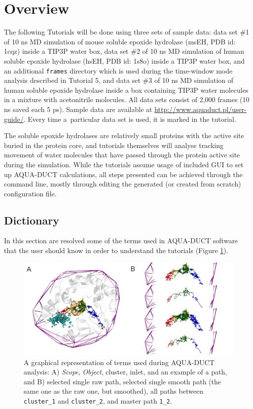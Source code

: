 \documentclass[9pt,tutorial]{livecoms}
\begin{document}
\section{Overview}
The following Tutorials will be done using three sets of sample data: data set \#1 of 10 ns MD simulation of mouse soluble epoxide hydrolase (msEH, PDB id: 1cqz) inside a TIP3P water box, data set \#2 of 10 ns MD simulation of human soluble epoxide hydrolase (hsEH, PDB id: 1s8o) inside a TIP3P water box, and an additional \texttt{frames} directory which is used during the time-window mode analysis described in Tutorial 5, and data set \#3 of 10 ns MD simulation of human soluble epoxide hydrolase inside a box containing TIP3P water molecules in a mixture with acetonitrile molecules. All data sets consist of 2,000 frames (10 ns saved each 5 ps). Sample data are available at \url{http://www.aquaduct.pl/user-guide/}. Every time a~particular data set is used, it is marked in the tutorial.

The soluble epoxide hydrolases are relatively small proteins with the active site buried in the protein core, and tutorials themselves will analyse tracking movement of water molecules that have passed through the protein active site during the simulation. While the tutorials assume usage of included GUI to set up AQUA-DUCT calculations, all steps presented can be achieved through the command line, mostly through editing the generated (or created from scratch) configuration file.
 
\subsection{Dictionary}

In this section are resolved some of the terms used in AQUA-DUCT software that the user should know in order to understand the tutorials (Figure \ref{Dict}).

\begin{figure}[ht!]
\centering
\includegraphics[width=\textwidth]{dictionary.png}
\caption{A graphical representation of terms used during AQUA-DUCT analysis: A) \emph{Scope}, \emph{Object}, cluster, inlet, and an example of a path, and B) selected single raw path, selected single smooth path (the same one as the raw one, but smoothed), all paths between \texttt{cluster\_1} and \texttt{cluster\_2}, and master path \texttt{1\_2}.}
\label{Dict}
\end{figure}
\end{document}

